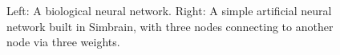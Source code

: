 \begin{figure}[h]
\centering
{}
\hspace*{.2in}
\caption[Left: Mark Miller, Nelson Lab, Brandeis University. Licensed Under: CC BY-ND; Right: Simbrain screenshot.]{Left: A biological neural network. Right: A simple artificial neural network built in Simbrain, with three nodes connecting to another node via three weights.}
\label{introNets}
\end{figure}

